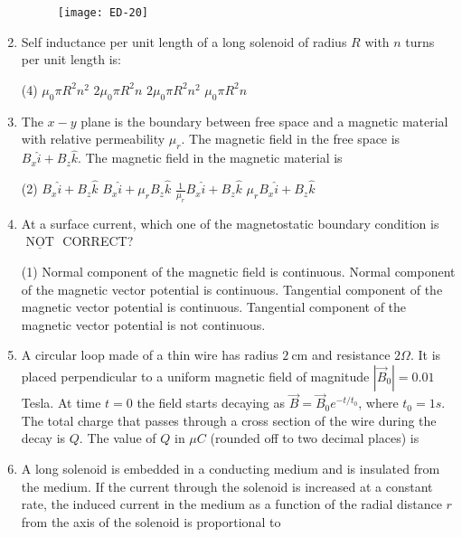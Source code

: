 \begin{enumerate}
		{}
	\begin{figure}[H]
		\centering
		\texttt{[image: ED-20]}
	\end{figure}
\item Self inductance per unit length of a long solenoid of radius $R$ with $n$ turns per unit length is:
	{}
 \begin{tasks}(4)
	\task[\textbf{a.}]$\mu_{0} \pi R^{2} n^{2}$
	\task[\textbf{b.}]$2 \mu_{0} \pi R^{2} n$
	\task[\textbf{c.}]$2 \mu_{0} \pi R^{2} n^{2}$
	\task[\textbf{d.}] $\mu_{0} \pi R^{2} n$
\end{tasks}	
\item The $x-y$ plane is the boundary between free space and a magnetic material with relative permeability $\mu_{r}$. The magnetic field in the free space is $B_{x} \hat{i}+B_{z} \hat{k}$. The magnetic field in the magnetic material is
	{}
 \begin{tasks}(2)
	\task[\textbf{a.}]$B_{x} \hat{i}+B_{z} \hat{k}$
	\task[\textbf{b.}]$B_{x} \hat{i}+\mu_{r} B_{z} \hat{k}$
	\task[\textbf{c.}] $\frac{1}{\mu_{r}} B_{x} \hat{i}+B_{z} \hat{k}$
	\task[\textbf{d.}] $\mu_{r} B_{x} \hat{i}+B_{z} \hat{k}$
\end{tasks}	
\item 	At a surface current, which one of the magnetostatic boundary condition is $\underline{\text { NOT }}$ CORRECT?
{}
	 \begin{tasks}(1)
		\task[\textbf{a.}]Normal component of the magnetic field is continuous.
		\task[\textbf{b.}]Normal component of the magnetic vector potential is continuous.
		\task[\textbf{c.}] Tangential component of the magnetic vector potential is continuous.
		\task[\textbf{d.}] Tangential component of the magnetic vector potential is not continuous.
	\end{tasks}
\item A circular loop made of a thin wire has radius $2 \mathrm{~cm}$ and resistance $2 \Omega$. It is placed perpendicular to a uniform magnetic field of magnitude $\left|\vec{B}_{0}\right|=0.01$ Tesla. At time $t=0$ the field starts decaying as $\vec{B}=\vec{B}_{0} e^{-t / t_{0}}$, where $t_{0}=1 s$. The total charge that passes through a cross section of the wire during the decay is $Q$. The value of $Q$ in $\mu C$ (rounded off to two decimal places) is
{}
\item A long solenoid is embedded in a conducting medium and is insulated from the medium. If the current through the solenoid is increased at a constant rate, the induced current in the medium as a function of the radial distance $r$ from the axis of the solenoid is proportional to

\end{enumerate}
